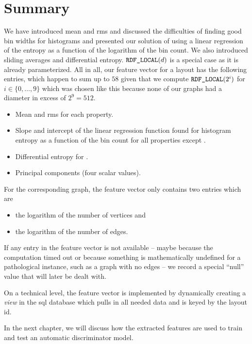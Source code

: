 \documentclass{graphstudy}
\begin{document}
\section{Summary}

We have introduced mean and \ac{rms} and discussed the difficulties of finding good bin widths for histograms and
presented our solution of using a linear regression of the entropy as a function of the logarithm of the bin count.  We
also introduced sliding averages and differential entropy.  \(\mbox{\text{\upshape\ttfamily RDF\_LOCAL}}(d)\) is a special case as it is already
parameterized.  All in all, our feature vector for a layout has the following entries, which happen to sum up to \(58\)
given that we compute \(\mbox{\text{\upshape\ttfamily RDF\_LOCAL}}(2^i)\) for \(i\in\{0,\ldots,9\}\) which was chosen like this because none of
our graphs had a diameter in excess of \(2^9=512\).

\begin{itemize}
\item Mean and \ac{rms} for each property.
\item Slope and intercept of the linear regression function found for histogram entropy as a function of the bin count
  for all properties except .
\item Differential entropy for .
\item Principal components (four scalar values).
\end{itemize}

For the corresponding graph, the feature vector only contains two entries which are
\begin{itemize}
\item the logarithm of the number of vertices and
\item the logarithm of the number of edges.
\end{itemize}

If any entry in the feature vector is not available -- maybe because the computation timed out or because something is
mathematically undefined for a pathological instance, such as a graph with no edges -- we record a special
\enquote{null} value that will later be dealt with.

On a technical level, the feature vector is implemented by dynamically creating a \emph{view} in the \acs{sql} database
which pulls in all needed data and is keyed by the layout \acs{id}.

In the next chapter, we will discuss how the extracted features are used to train and test an automatic discriminator
model.
\end{document}
